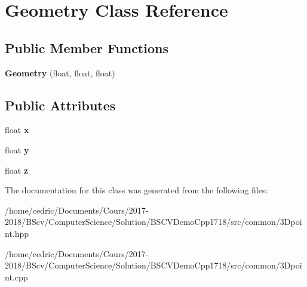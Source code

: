 \hypertarget{class_geometry}{}\section{Geometry Class Reference}
\label{class_geometry}
\subsection*{Public Member Functions}
\begin{DoxyCompactItemize}
\item 
\mbox{\label{class_geometry_abccea52f155c1ee04c44fb1b1affaaf5}} 
{\bfseries Geometry} (float, float, float)
\end{DoxyCompactItemize}
\subsection*{Public Attributes}
\begin{DoxyCompactItemize}
\item 
\mbox{\label{class_geometry_a35468b79e1123f7a1e0f938be380be63}} 
float {\bfseries x}
\item 
\mbox{\label{class_geometry_a15f2fa8b5f9e1b47472254df36ec0747}} 
float {\bfseries y}
\item 
\mbox{\label{class_geometry_a089774d2def6ba6edc090d49fa800e75}} 
float {\bfseries z}
\end{DoxyCompactItemize}


The documentation for this class was generated from the following files\+:\begin{DoxyCompactItemize}
\item 
/home/cedric/\+Documents/\+Cours/2017-\/2018/\+B\+Scv/\+Computer\+Science/\+Solution/\+B\+S\+C\+V\+Demo\+Cpp1718/src/common/3\+Dpoint.\+hpp\item 
/home/cedric/\+Documents/\+Cours/2017-\/2018/\+B\+Scv/\+Computer\+Science/\+Solution/\+B\+S\+C\+V\+Demo\+Cpp1718/src/common/3\+Dpoint.\+cpp\end{DoxyCompactItemize}
